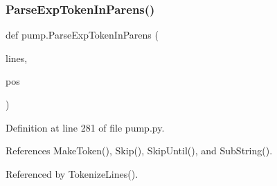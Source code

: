 \subsubsection{\texorpdfstring{Parse\+Exp\+Token\+In\+Parens()}{ParseExpTokenInParens()}}
{\footnotesize\ttfamily def pump.\+Parse\+Exp\+Token\+In\+Parens (\begin{DoxyParamCaption}\item[{}]{lines,  }\item[{}]{pos }\end{DoxyParamCaption})}



Definition at line 281 of file pump.\+py.



References Make\+Token(), Skip(), Skip\+Until(), and Sub\+String().



Referenced by Tokenize\+Lines().


